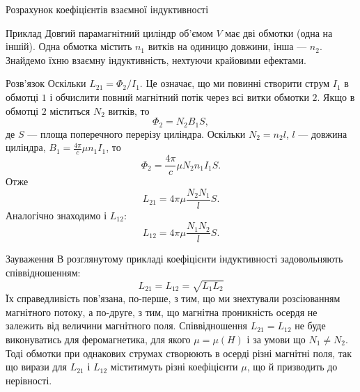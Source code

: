 \documentclass[onlytextwidth]{beamer}
\begin{document}
\begin{frame}{Розрахунок коефіцієнтів взаємної індуктивності}{}\small
	\begin{exampleblock}{Приклад}\justifying
		Довгий парамагнітний циліндр об'ємом $V$ має дві обмотки (одна на іншій). Одна обмотка містить $n_1$ витків на одиницю довжини, інша ---
		$n_2$. Знайдемо їхню взаємну індуктивність, нехтуючи крайовими ефектами.
	\end{exampleblock}

	\begin{overprint}
		\begin{block}{Розв'язок}\justifying
			Оскільки $L_{21} = \Phi_2 / I_1$. Це означає, що ми повинні створити струм $I_1$ в обмотці $1$ і обчислити повний магнітний потік через всі витки
			обмотки $2$. Якщо в обмотці $2$ міститься $N_2$ витків, то
			\[
				\Phi_2 = N_2 B_1 S,
			\]
			де $S$ --- площа поперечного перерізу циліндра. Оскільки $N_2 = n_2 l$, $l$ --- довжина циліндра, $B_1 = \frac{4\pi}{c} \mu n_1 I_1$, то
			\[
				\Phi_2 =  \frac{4\pi}{c} \mu N_2 n_1 I_1 S.
			\]
			Отже
			\[
				L_{21} = 4\pi \mu \frac{N_2 N_1}{l} S.
			\]
			Аналогічно знаходимо і $L_{12}$:
			\[
				L_{12} = 4\pi \mu \frac{N_1 N_2}{l} S.
			\]
		\end{block}
		\begin{block}{Зауваження}\justifying
			В розглянутому прикладі коефіцієнти індуктивності задовольняють співвідношенням:
			\begin{equation*}
				L_{21} = L_{12} = \sqrt{L_1L_2}
			\end{equation*}
			Їх справедливість пов'язана, по-перше, з тим, що ми знехтували розсіюванням магнітного потоку, а по-друге, з тим, що магнітна проникність осердя не
			залежить від величини магнітного поля. Співвідношення $L_{21} = L_{12}$ не буде виконуватись для феромагнетика, для якого  $\mu = \mu(H)$ і за умови що
			$N_1 \neq N_2$. Тоді обмотки при однакових струмах створюють в осерді різні магнітні поля, так що вирази для $L_{21}$ і $L_{12}$ міститимуть різні
			коефіцієнти $\mu$, що й
			призводить до нерівності.
		\end{block}
	\end{overprint}
\end{frame}
\end{document}
